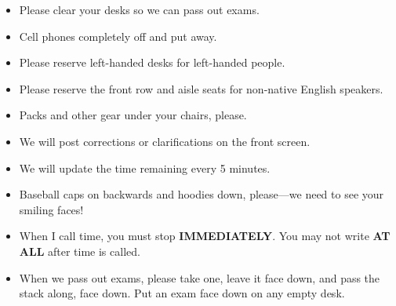 \begin{frame}
    \begin{itemize}
        \item Please clear your desks so we can pass out exams.
        \item Cell phones completely off and put away.
        \item Please reserve left-handed desks for left-handed people.
        \item Please reserve the front row and aisle seats for
            non-native English speakers.
        \item Packs and other gear under your chairs, please.
        \item We will post corrections or clarifications on the front screen.
        \item We will update the time remaining every 5 minutes.
        \item Baseball caps on backwards and hoodies down, please---we need to
            see your smiling faces!
        \item When I call time, you must stop \textbf{IMMEDIATELY}. You may not
            write \textbf{AT ALL} after time is called.
        \item When we pass out exams, please take one, leave it face down, and
            pass the stack along, face down. Put an exam face down on any empty
            desk.
    \end{itemize}
\end{frame}

